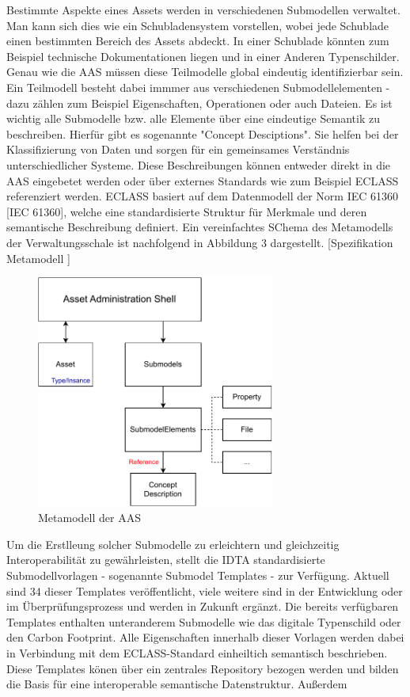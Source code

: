 Bestimmte Aspekte eines Assets werden in verschiedenen Submodellen verwaltet.
Man kann sich dies wie ein Schubladensystem vorstellen, wobei jede Schublade einen bestimmten Bereich des Assets abdeckt.
In einer Schublade könnten zum Beispiel technische Dokumentationen liegen und in einer Anderen Typenschilder. 
Genau wie die AAS müssen diese Teilmodelle global eindeutig identifizierbar sein.
Ein Teilmodell besteht dabei immmer aus verschiedenen Submodellelementen - dazu zählen zum Beispiel Eigenschaften, Operationen oder auch Dateien.
Es ist wichtig alle Submodelle bzw. alle Elemente über eine eindeutige Semantik zu beschreiben.
Hierfür gibt es sogenannte "Concept Desciptions".
Sie helfen bei der Klassifizierung von Daten und sorgen für ein gemeinsames Verständnis unterschiedlicher Systeme.
Diese Beschreibungen können entweder direkt in die AAS eingebetet werden oder über externes Standards wie zum Beispiel ECLASS referenziert werden.
ECLASS basiert auf dem Datenmodell der Norm IEC 61360 [IEC 61360], welche eine standardisierte Struktur für Merkmale und deren semantische Beschreibung definiert.
Ein vereinfachtes SChema des Metamodells der Verwaltungsschale ist nachfolgend in Abbildung 3 dargestellt.  [Spezifikation Metamodell
]

\begin{figure}[htbp]
    \centering
    \includegraphics[width=0.7\textwidth]{Bilder/Metamodel.pdf}
    \caption{Metamodell der AAS}
    \label{fig:klassifizierungDT}
\end{figure}

Um die Erstlleung solcher Submodelle zu erleichtern und gleichzeitig Interoperabilität zu gewährleisten, stellt die IDTA standardisierte Submodellvorlagen - sogenannte Submodel Templates - zur Verfügung.
Aktuell sind 34 dieser Templates veröffentlicht, viele weitere sind in der Entwicklung oder im Überprüfungsprozess und werden in Zukunft ergänzt.
Die bereits verfügbaren Templates enthalten unteranderem Submodelle wie das digitale Typenschild oder den Carbon Footprint.
Alle Eigenschaften innerhalb dieser Vorlagen werden dabei in Verbindung mit dem ECLASS-Standard einheiltich semantisch beschrieben.
Diese Templates könen über ein zentrales Repository bezogen werden und bilden die Basis für eine interoperable semantische Datenstruktur.
Außerdem 


